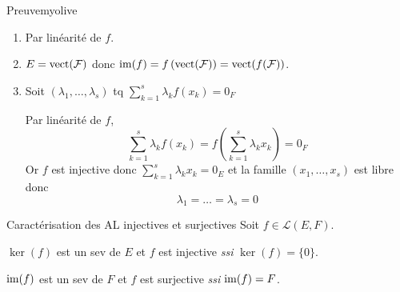    \begin{demo}{Preuve}{myolive}
        \begin{enumerate}
            \item Par linéarité de $f$.
            \item $ E = \operatorname{vect}(\mathcal{F})$ donc $\operatorname{im}(f) = f \left( \operatorname{vect}(\mathcal{F})\right) = \operatorname{vect}(f(\mathcal{F}))$.
            \item Soit $(\lambda_1 ,\ldots,\lambda_s)$ tq $\sum\limits_{k=1}^s \lambda_k f(x_k) = 0_F$
    
            Par linéarité de $f$, \[ \sum\limits_{k=1}^s \lambda_k f(x_k) = f \left(\sum\limits_{k=1}^s \lambda_k x_k\right)= 0_F \] 
            Or $f$ est injective donc $\sum\limits_{k=1}^s \lambda_k x_k = 0_E$ et la famille $(x_1,\ldots,x_s)$ est libre donc 
            \[ \lambda_1 = \ldots = \lambda_s = 0 \]
        \end{enumerate}
    \end{demo}

    \begin{prop}{Caractérisation des AL injectives et surjectives}{}
        Soit $f \in \mathcal{L}(E,F)$.
        
        \begin{alors}
            \item $\ker(f)$ est un sev de $E$ et $f$ est injective \textit{ssi} $\ker(f) = \{0\}$.
            \item $\operatorname{im}(f)$ est un sev de $F$ et $f$ est surjective \textit{ssi} $\operatorname{im}(f) = F$.
        \end{alors}
    \end{prop}

